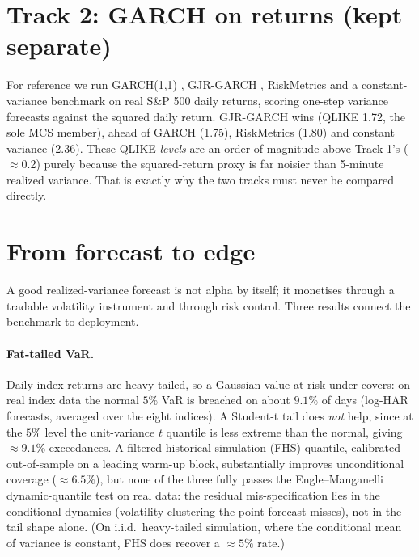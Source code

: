 \documentclass[11pt]{article}
\begin{document}
\section{Track 2: GARCH on returns (kept separate)}
For reference we run GARCH(1,1) \cite{bollerslev1986}, GJR-GARCH \cite{gjr1993}, RiskMetrics and a constant-variance
benchmark on real S\&P 500 daily returns, scoring one-step variance forecasts
against the squared daily return. GJR-GARCH wins (QLIKE 1.72, the sole MCS
member), ahead of GARCH (1.75), RiskMetrics (1.80) and constant variance (2.36).
These QLIKE \emph{levels} are an order of magnitude above Track 1's ($\approx$0.2)
purely because the squared-return proxy is far noisier than 5-minute realized
variance. That is exactly why the two tracks must never be compared directly.

\section{From forecast to edge}
A good realized-variance forecast is not alpha by itself; it monetises through a
tradable volatility instrument and through risk control. Three results connect
the benchmark to deployment.

\paragraph{Fat-tailed VaR.} Daily index returns are heavy-tailed, so a Gaussian
value-at-risk under-covers: on real index data the normal $5\%$ VaR is breached on
about $9.1\%$ of days (log-HAR forecasts, averaged over the eight indices). A
Student-t tail does \emph{not} help, since at the $5\%$ level the unit-variance $t$
quantile is less extreme than the normal, giving $\approx 9.1\%$ exceedances. A
filtered-historical-simulation (FHS) quantile, calibrated out-of-sample on a
leading warm-up block, substantially improves unconditional coverage
($\approx 6.5\%$), but none of the three fully passes the Engle--Manganelli
dynamic-quantile test \cite{engleman2004} on real data: the residual mis-specification lies in the
conditional dynamics (volatility clustering the point forecast misses), not in the
tail shape alone. (On i.i.d.\ heavy-tailed simulation, where the conditional mean
of variance is constant, FHS does recover a $\approx 5\%$ rate.)
\end{document}
